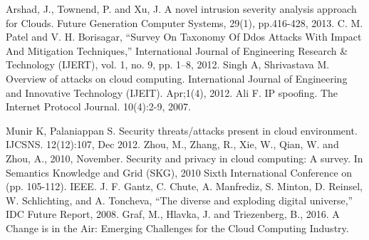\documentclass[10pt,journal,compsoc]{IEEEtran}
\begin{document}
\begin{thebibliography}{1}
\vspace{5mm}
\bibitem{}
Arshad, J., Townend, P. and Xu, J. A novel intrusion severity analysis approach for Clouds. Future Generation Computer Systems, 29(1), pp.416-428, 2013.
\vspace{5mm}
\bibitem{}
C. M. Patel and V. H. Borisagar, “Survey On Taxonomy Of Ddos Attacks With Impact And Mitigation Techniques,” International Journal of Engineering Research \& Technology (IJERT), vol. 1, no. 9, pp. 1–8, 2012.
\vspace{5mm}
\bibitem{}
Singh A, Shrivastava M. Overview of attacks on cloud computing. International Journal of Engineering and Innovative Technology (IJEIT). Apr;1(4), 2012. 
\vspace{5mm}
\bibitem{}
Ali F. IP spoofing. The Internet Protocol Journal. 10(4):2-9, 2007.
\vspace{5mm}

\bibitem{}
Munir K, Palaniappan S. Security threats/attacks present in cloud environment. IJCSNS. 12(12):107, Dec 2012.
\vspace{5mm}
\bibitem{}
Zhou, M., Zhang, R., Xie, W., Qian, W. and Zhou, A., 2010, November. Security and privacy in cloud computing: A survey. In Semantics Knowledge and Grid (SKG), 2010 Sixth International Conference on (pp. 105-112). IEEE.
\vspace{5mm}
\bibitem{}
J. F. Gantz, C. Chute, A. Manfrediz, S. Minton, D. Reinsel, W. Schlichting, and A. Toncheva, “The diverse and exploding digital universe,” IDC Future Report, 2008.
\vspace{5mm}
\bibitem{}
Graf, M., Hlavka, J. and Triezenberg, B., 2016. A Change is in the Air: Emerging Challenges for the Cloud Computing Industry.

\end{thebibliography}
\vspace{-8cm}





\end{document}
